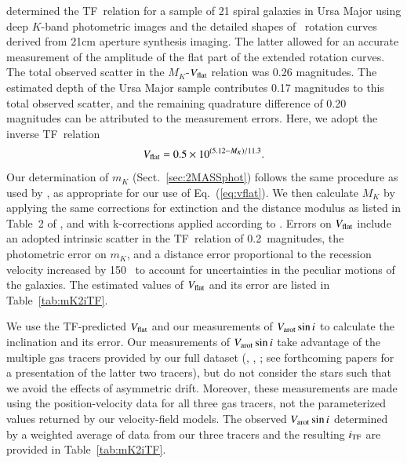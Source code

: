 \documentclass[traditabstract]{aa} %
\begin{document}
\citet{verheyen2001b} determined the TF~relation for a sample of 21 spiral
galaxies in Ursa Major using deep $K$-band photometric images and the detailed
shapes of \hone\ rotation curves derived from 21cm aperture synthesis imaging.
The latter allowed for an accurate measurement of the amplitude of the flat part
of the extended rotation curves.  The total observed scatter in the
$M_K$-$V_{\rm flat}$ relation was 0.26 magnitudes.  The estimated depth of the
Ursa Major sample contributes 0.17 magnitudes to this total observed scatter,
and the remaining quadrature difference of 0.20 magnitudes can be attributed to
the measurement errors.  Here, we adopt the inverse TF~relation 
%
\begin{equation}
%
V_{\rm flat} = 0.5 \times 10^{(5.12 - M_K)/11.3}.
%
\label{eq:vflat}
%
\end{equation}
%
Our determination of $m_K$ (Sect.~\ref{sec:2MASSphot}) follows the same
procedure as used by \citet{verheyen2001b}, as appropriate for our use of
Eq.~(\ref{eq:vflat}).  We then calculate $M_K$ by applying the same
corrections for extinction and the distance modulus as listed in Table~2 of
, and with k-corrections applied according to
\citet{bershady1995}.  Errors on $V_{\rm flat}$ include an adopted intrinsic
scatter in the TF~relation of 0.2~magnitudes, the photometric error on $m_K$,
and a distance error proportional to the recession velocity increased by 150
\kms\ to account for uncertainties in the peculiar motions of the galaxies. The
estimated values of $V_{\rm flat}$ and its error are listed in
Table~\ref{tab:mK2iTF}.

We use the TF-predicted $V_{\rm flat}$ and our measurements of $V_{\rm arot} \sin i$ to
calculate the inclination and its error.  Our measurements of $V_{\rm arot} \sin i$
take advantage of the multiple gas tracers provided by our full dataset (\oiii,
\halp, \hone; see forthcoming papers for a presentation of the latter two
tracers), but do not consider the stars such that we avoid the effects of
asymmetric drift.  Moreover, these measurements are made using the
position-velocity data for all three gas tracers, not the parameterized values
returned by our velocity-field models.  The observed $V_{\rm arot} \sin i$ determined
by a weighted average of data from our three tracers and the resulting $i_{\rm TF}$
are provided in Table~\ref{tab:mK2iTF}. 
\end{document}
